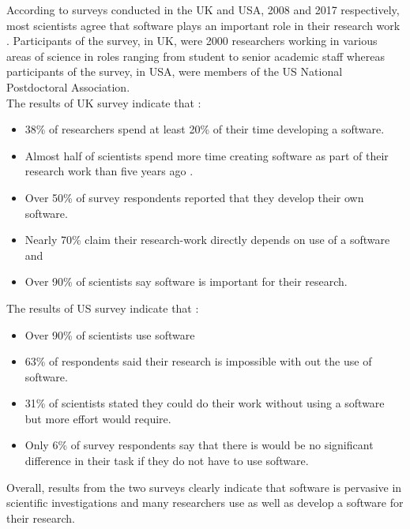 According to surveys conducted in the UK and USA, 2008 and 2017 respectively, most scientists agree that software plays an important role in their research work \citep{hettrick2014uk, nangia2017track}. Participants of the survey, in UK, were 2000 researchers working in various areas of science in roles ranging from student to senior academic staff whereas participants of the survey, in USA, were members of the US National Postdoctoral Association. \\
 
\noindent The results of UK survey indicate that \citep{hettrick2014uk}:
\begin{itemize}%
	\itemsep0em 
	\item 38\% of researchers spend at least 20\% of their time developing a software.
	\item Almost half of scientists spend more time creating software as part of their research work than five years ago .
	\item Over 50\% of survey respondents reported that they develop their own software. 
	\item Nearly 70\% claim their research-work directly depends on use of a software and
	\item Over 90\% of scientists say software is important for their research. \\
\end{itemize}

\noindent The results of US survey indicate that \citep{nangia2017track}:
\begin{itemize}%
	\itemsep0em
	\item Over 90\% of scientists use software 
	\item 63\% of respondents said their research is impossible with out the use of software.
	\item 31\% of scientists stated they could do their work without using a software but more effort would require.
	\item Only 6\% of survey respondents say that there is would be no significant difference in their task if they do not have to use software. 
	
\end{itemize}

Overall, results from the two surveys clearly indicate that software is pervasive in scientific investigations and many researchers use as well as develop a software for their research. \\

